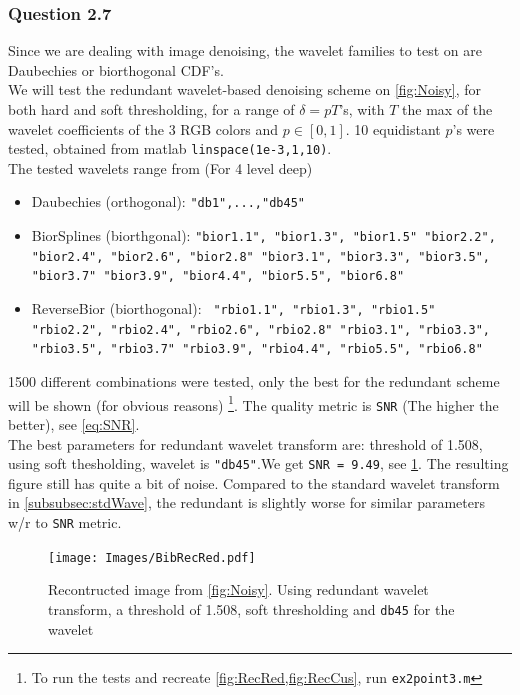 \documentclass[a4paper]{article}
\begin{document}
    \subsubsection{Question 2.7}
	Since we are dealing with image denoising, the wavelet families to test on are Daubechies or biorthogonal CDF's. \\

	We will test the redundant wavelet-based denoising scheme on \cref{fig:Noisy}, for both hard and soft thresholding, for a range of $\delta = p T$'s, with $T$ the max of the wavelet coefficients of the 3 RGB colors and $p \in [0,1]$. 10 equidistant $p$'s were tested, obtained from matlab \texttt{linspace(\texttt{1e-3},1,10)}. \\
The tested wavelets range from (For 4 level deep)
\begin{itemize}
	\item Daubechies (orthogonal): \texttt{"db1",...,"db45"}
	\item BiorSplines (biorthgonal): \texttt{"bior1.1", "bior1.3", "bior1.5"
		"bior2.2", "bior2.4", "bior2.6", "bior2.8"
		"bior3.1", "bior3.3", "bior3.5", "bior3.7"
		"bior3.9", "bior4.4", "bior5.5", "bior6.8"}	
	\item ReverseBior (biorthogonal): \texttt{	"rbio1.1", "rbio1.3", "rbio1.5"
		"rbio2.2", "rbio2.4", "rbio2.6", "rbio2.8"	
		"rbio3.1", "rbio3.3", "rbio3.5", "rbio3.7"
		"rbio3.9", "rbio4.4", "rbio5.5", "rbio6.8"}
\end{itemize}
1500 different combinations were tested, only the best for the redundant scheme will be shown (for obvious reasons) \footnote{To run the tests and recreate \cref{fig:RecRed,fig:RecCus}, run \texttt{ex2point3.m}}. The quality metric is \texttt{SNR} (The higher the better), see \cref{eq:SNR}.\\

The best parameters for redundant wavelet transform are: threshold of 1.508, using soft thesholding, wavelet is \texttt{"db45"}.We get \texttt{SNR = 9.49}, see \cref{fig:RecRed}. The resulting figure still has quite a bit of noise. 	Compared to the standard wavelet transform in \cref{subsubsec:stdWave}, the redundant is slightly worse for similar parameters w/r to \texttt{SNR} metric.\\

    \begin{figure}[H]
	\centering
	\texttt{[image: Images/BibRecRed.pdf]}
	\caption{Recontructed image from \cref{fig:Noisy}. Using redundant wavelet transform, a threshold of 1.508, soft thresholding and \texttt{db45} for the wavelet}
	\label{fig:RecRed}
\end{figure}
\end{document}
